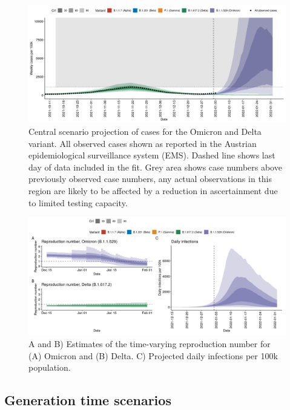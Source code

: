 \documentclass[
]{article}
\begin{document}
\begin{figure}
\includegraphics[width=1\linewidth]{omicron_austria_files/figure-latex/central-projection-1} \caption{Central scenario projection of cases for the Omicron and Delta variant. All observed cases shown as reported in the Austrian epidemiological surveillance system (EMS). Dashed line shows last day of data included in the fit. Grey area shows case numbers above previously observed case numbers, any actual observations in this region are likely to be affected by a reduction in ascertainment due to limited testing capacity.}\label{fig:central-projection}
\end{figure}

\begin{figure}
\includegraphics[width=1\linewidth]{omicron_austria_files/figure-latex/central-projection-rt-infections-1} \caption{A and B) Estimates of the time-varying reproduction number for (A) Omicron and (B) Delta. C) Projected daily infections per 100k population.}\label{fig:central-projection-rt-infections}
\end{figure}

\hypertarget{generation-time-scenarios}{%
\subsection{Generation time scenarios}\label{generation-time-scenarios}}
\end{document}

